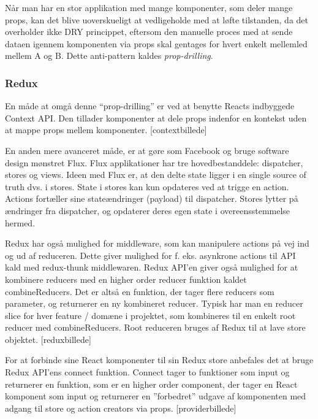 \documentclass[]{article}
\begin{document}
Når man har en stor applikation med mange komponenter, som deler mange
props, kan det blive uoverskueligt at vedligeholde med at løfte
tilstanden, da det overholder ikke DRY princippet, eftersom den manuelle
proces med at sende dataen igennem komponenten via props skal gentages
for hvert enkelt mellemled mellem A og B. Dette anti-pattern kaldes
\emph{prop-drilling}.

\hypertarget{redux}{%
\subsubsection{Redux}\label{redux}}

En måde at omgå denne ``prop-drilling'' er ved at benytte Reacts
indbyggede Context API. Den tillader komponenter at dele props indenfor
en kontekst uden at mappe props mellem komponenter. {[}contextbillede{]}

En anden mere avanceret måde, er at gøre som Facebook og bruge software
design mønstret Flux. Flux applikationer har tre hovedbestanddele:
dispatcher, stores og views. Ideen med Flux er, at den delte state
ligger i en single source of truth dvs. i stores. State i stores kan kun
opdateres ved at trigge en action. Actions fortæller sine stateændringer
(payload) til dispatcher. Stores lytter på ændringer fra dispatcher, og
opdaterer deres egen state i overeensstemmelse hermed.

Redux har også mulighed for middleware, som kan manipulere actions på
vej ind og ud af reduceren. Dette giver mulighed for f. eks. asynkrone
actions til API kald med redux-thunk middlewaren. Redux API'en giver
også mulighed for at kombinere reducers med en higher order reducer
funktion kaldet combineReducers. Det er altså en funktion, der tager
flere reducers som parameter, og returnerer en ny kombineret reducer.
Typisk har man en reducer slice for hver feature / domæne i projektet,
som kombineres til en enkelt root reducer med combineReducers. Root
reduceren bruges af Redux til at lave store objektet. {[}reduxbillede{]}

For at forbinde sine React komponenter til sin Redux store anbefales det
at bruge Redux API'ens connect funktion. Connect tager to funktioner som
input og returnerer en funktion, som er en higher order component, der
tager en React komponent som input og returnerer en ''forbedret'' udgave
af komponenten med adgang til store og action creators via props.
{[}providerbillede{]}
\end{document}
